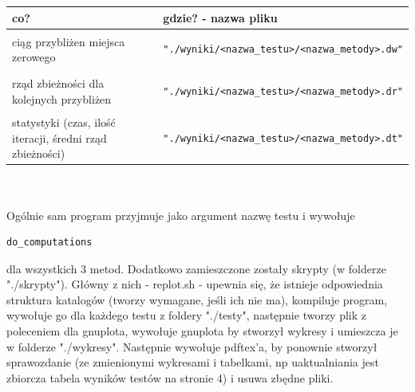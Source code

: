 \documentclass[11pt,wide]{mwart}
\begin{document}
\begin{tabular}{l l}
   \hline
  co?                                                       & gdzie? - nazwa pliku\\
  \hline
  ciąg przybliżen miejsca zerowego                          & 
    \begin{minipage}{3in} \begin{verbatim}"./wyniki/<nazwa_testu>/<nazwa_metody>.dw"\end{verbatim} 
      \end{minipage}\\
  rząd zbieżności dla kolejnych przybliżen                  & 
     \begin{minipage}{3in} \begin{verbatim}"./wyniki/<nazwa_testu>/<nazwa_metody>.dr"\end{verbatim} 
      \end{minipage}\\
  statystyki (czas, ilość iteracji, średni rząd zbieżności) & 
    \begin{minipage}{3in} \begin{verbatim}"./wyniki/<nazwa_testu>/<nazwa_metody>.dt"\end{verbatim} 
      \end{minipage}\\
\end{tabular}
\\ \\ \indent Ogólnie sam program przyjmuje jako argument nazwę testu i wywołuje 
\begin{verbatim}do_computations\end{verbatim} dla wszystkich 3 metod.
Dodatkowo zamieszczone zostały skrypty (w folderze "./skrypty"). Główny z nich - replot.sh - upewnia się, że istnieje odpowiednia struktura katalogów (tworzy wymagane, jeśli ich nie ma), kompiluje program, wywołuje go dla każdego testu z foldery "./testy", następnie tworzy plik z poleceniem dla gnuplota, wywołuje gnuplota by stworzył wykresy i umieszcza je w folderze "./wykresy". Następnie wywołuje pdftex'a, by ponownie stworzył sprawozdanie (ze zmienionymi wykresami i tabelkami, np uaktualniania jest zbiorcza tabela wyników testów na stronie 4) i usuwa zbędne pliki.
\end{document}
